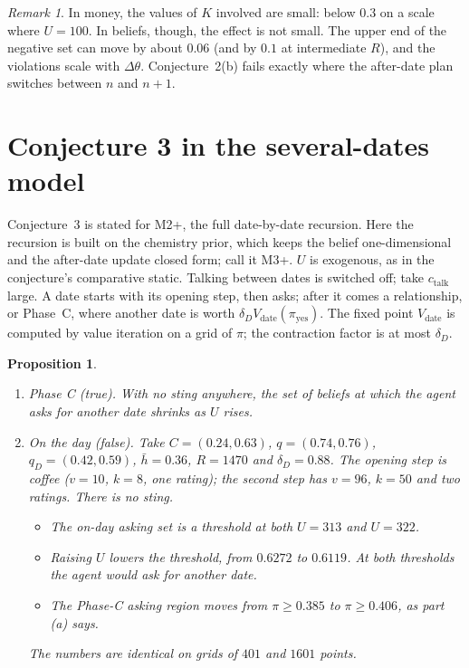 \documentclass[11pt,a4paper]{article}
\newtheorem{proposition}[theorem]{Proposition}
\theoremstyle{definition}
\theoremstyle{remark}
\newtheorem{remark}[theorem]{Remark}
\begin{document}
\begin{remark}
In money, the values of $K$ involved are small: below $0.3$ on a scale where $U=100$. In beliefs, though, the effect is not small. The upper end of the negative set can move by about $0.06$ (and by $0.1$ at intermediate $R$), and the violations scale with $\Delta\theta$. Conjecture~2(b) fails exactly where the after-date plan switches between $n$ and $n+1$.
\end{remark}

\section{Conjecture 3 in the several-dates model}\label{sec:c3}

Conjecture~3 is stated for M2+, the full date-by-date recursion. Here the recursion is built on the chemistry prior, which keeps the belief one-dimensional and the after-date update closed form; call it M3+. $U$ is exogenous, as in the conjecture's comparative static. Talking between dates is switched off; take $c_{\mathrm{talk}}$ large. A date starts with its opening step, then asks; after it comes a relationship, or Phase~C, where another date is worth $\delta_DV_{\mathrm{date}}(\pi_{\mathrm{yes}})$. The fixed point $V_{\mathrm{date}}$ is computed by value iteration on a grid of $\pi$; the contraction factor is at most $\delta_D$.

\begin{proposition}\label{prop:c3}
\begin{enumerate}[label=(\alph*)]
\item \emph{Phase C (true).} With no sting anywhere, the set of beliefs at which the agent asks for another date shrinks as $U$ rises.
\item \emph{On the day (false).} Take $C=(0.24,0.63)$, $q=(0.74,0.76)$, $q_D=(0.42,0.59)$, $\bar h=0.36$, $R=1470$ and $\delta_D=0.88$. The opening step is coffee ($v=10$, $k=8$, one rating); the second step has $v=96$, $k=50$ and two ratings. There is no sting.
\begin{itemize}[nosep]
\item The on-day asking set is a threshold at both $U=313$ and $U=322$.
\item Raising $U$ \emph{lowers} the threshold, from $0.6272$ to $0.6119$. At both thresholds the agent would ask for another date.
\item The Phase-C asking region moves from $\pi\ge0.385$ to $\pi\ge0.406$, as part (a) says.
\end{itemize}
The numbers are identical on grids of $401$ and $1601$ points.
\end{enumerate}
\end{proposition}
\end{document}
